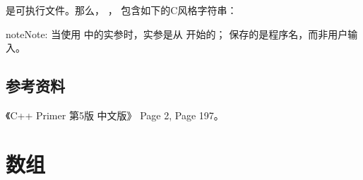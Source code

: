 \documentclass[letterpaper,10pt,english]{sphinxmanual}
\begin{document}
 是可执行文件。那么，  ， 包含如下的C风格字符串：

%
\begin{sphinxVerbatim}[commandchars=\\\{\},numbers=left,firstnumber=1,stepnumber=1]
\PYG{p}{[}\PYG{p}{]}  
\PYG{p}{[}\PYG{p}{]}  
\PYG{p}{[}\PYG{p}{]}  
\PYG{p}{[}\PYG{p}{]}  
\PYG{p}{[}\PYG{p}{]}  
\PYG{p}{[}\PYG{p}{]}  
\end{sphinxVerbatim}

\begin{sphinxadmonition}{note}{Note:}
当使用  中的实参时，实参是从  开始的；  保存的是程序名，而非用户输入。
\end{sphinxadmonition}


\subsection{参考资料}
\label{\detokenize{cpp/01_main:id3}}
《C++ Primer 第5版 中文版》 Page 2, Page 197。


\section{数组}
\label{\detokenize{cpp/02_array::doc}}\label{\detokenize{cpp/02_array:id1}}
\end{document}
